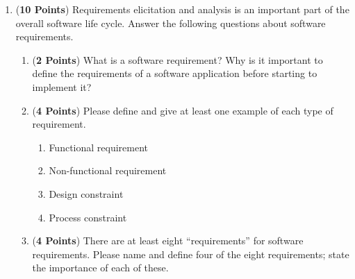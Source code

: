 \documentclass[12pt,epsf,psfig,graphics]{article}
\begin{document}
% 
\begin{enumerate}

\item ({\bf 10 Points}) Requirements elicitation and analysis is an important part of the overall software life cycle.
	Answer the following questions about software requirements.

\begin{enumerate}

	\item ({\bf 2 Points}) What is a software requirement? Why is it important to define the requirements of a software
		application before starting to implement it?

	\item ({\bf 4 Points}) Please define and give at least one example of each type of requirement.

		\begin{enumerate}
			\item Functional requirement
			\item Non-functional requirement
			\item Design constraint
			\item Process constraint
		\end{enumerate}

	\item ({\bf 4 Points}) There are at least eight ``requirements'' for software requirements.  Please name and define
		four of the eight requirements; state the importance of each of these.



% 

% 
\end{enumerate}


\end{enumerate}
\end{document}
